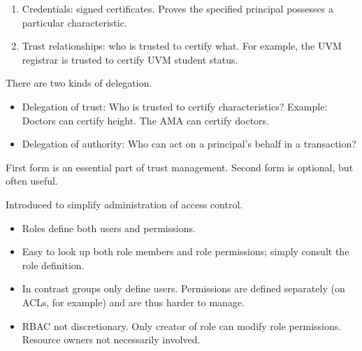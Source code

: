 \documentclass[landscape]{slides}
\begin{document}
\stopslide


\begin{enumerate}

\item Credentials: signed certificates. Proves the specified principal possesses a particular characteristic.

\item Trust relationships: who is trusted to certify what. For example, the UVM registrar is trusted to certify UVM student status.

\end{enumerate}
\stopslide



There are two kinds of delegation.

\begin{itemize}

\item Delegation of trust: Who is trusted to certify characteristics? Example: Doctors can certify height. The AMA can certify doctors.

\item Delegation of authority: Who can act on a principal's behalf in a transaction?

\end{itemize}

First form is an essential part of trust management. Second form is optional, but often useful.

\stopslide




\centerline{\box\graph}

\stopslide



Introduced to simplify administration of access control.

\begin{itemize}

\item Roles define both users and permissions.

\item Easy to look up both role members and role permissions; simply consult the role definition.

\item In contrast groups only define users. Permissions are defined separately (on ACLs, for example) and are thus harder to manage.

\item RBAC not discretionary. Only creator of role can modify role permissions. Resource owners not necessarily involved.

\end{itemize}
\end{document}
